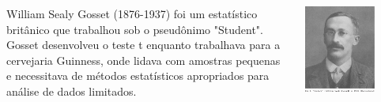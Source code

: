 \documentclass[12pt]{beamer}
\begin{document}
\begin{frame}{}
	\begin{block}{}
		\begin{columns} %
			
			\begin{column}{0.6\textwidth} %
				\vfill
				\centering
				\justifying
				William Sealy Gosset (1876-1937) foi um estatístico britânico que trabalhou sob o pseudônimo "Student". Gosset desenvolveu o teste t enquanto trabalhava para a cervejaria Guinness, onde lidava com amostras pequenas e necessitava de métodos estatísticos apropriados para análise de dados limitados.
			\end{column}
			
			\begin{column}{0.3\textwidth} %
				\includegraphics[width=0.7\textwidth]{figs/Gosset.png} %
			\end{column}
			
		\end{columns}
	\end{block}
\end{frame}
\end{document}
